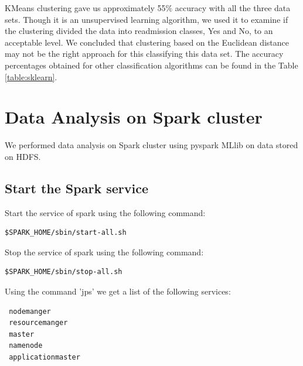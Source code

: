 \documentclass[9pt,twocolumn,twoside]{styles/osajnl}
\begin{document}
KMeans clustering gave us approximately 55$\%$ accuracy with all the three data sets.  Though it is an unsupervised learning algorithm, we used it to examine if the clustering divided the data into readmission classes, Yes and No, to an acceptable level. We concluded that clustering based on the Euclidean distance may not be the right approach for this classifying this data set. The accuracy percentages obtained  for other classification algorithms can be found  in the Table \ref{table:sklearn}.




\section{Data Analysis on Spark cluster}
We performed data analysis on Spark cluster using pyspark MLlib on data stored on HDFS.

\subsection{Start the Spark service}

Start the service of spark using the following command:
\begin{verbatim}
$SPARK_HOME/sbin/start-all.sh
\end{verbatim}



Stop the service of spark using the following command:
\begin{verbatim}
$SPARK_HOME/sbin/stop-all.sh
\end{verbatim}


Using the command 'jps' we get a list of the following services:
\begin{verbatim}
 nodemanger
 resourcemanger
 master
 namenode
 applicationmaster
\end{verbatim}
\end{document}
